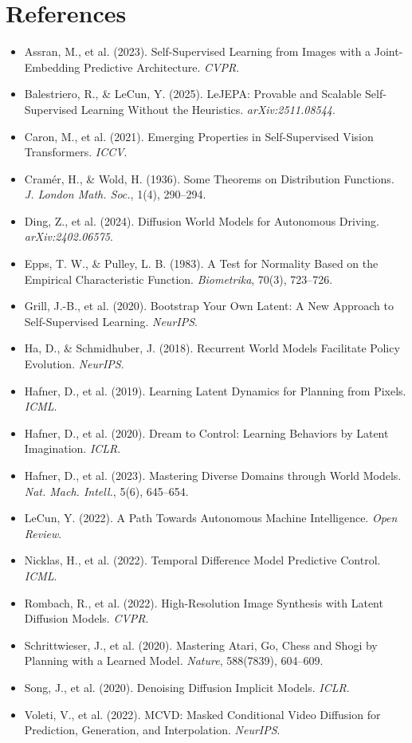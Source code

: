 \documentclass{article}
\begin{document}
\section*{References}
\small
\begin{itemize}
    \item Assran, M., et al. (2023). Self-Supervised Learning from Images with a Joint-Embedding Predictive Architecture. \emph{CVPR}.
    \item Balestriero, R., \& LeCun, Y. (2025). LeJEPA: Provable and Scalable Self-Supervised Learning Without the Heuristics. \emph{arXiv:2511.08544}.
    \item Caron, M., et al. (2021). Emerging Properties in Self-Supervised Vision Transformers. \emph{ICCV}.
    \item Cramér, H., \& Wold, H. (1936). Some Theorems on Distribution Functions. \emph{J. London Math. Soc.}, 1(4), 290--294.
    \item Ding, Z., et al. (2024). Diffusion World Models for Autonomous Driving. \emph{arXiv:2402.06575}.
    \item Epps, T. W., \& Pulley, L. B. (1983). A Test for Normality Based on the Empirical Characteristic Function. \emph{Biometrika}, 70(3), 723--726.
    \item Grill, J.-B., et al. (2020). Bootstrap Your Own Latent: A New Approach to Self-Supervised Learning. \emph{NeurIPS}.
    \item Ha, D., \& Schmidhuber, J. (2018). Recurrent World Models Facilitate Policy Evolution. \emph{NeurIPS}.
    \item Hafner, D., et al. (2019). Learning Latent Dynamics for Planning from Pixels. \emph{ICML}.
    \item Hafner, D., et al. (2020). Dream to Control: Learning Behaviors by Latent Imagination. \emph{ICLR}.
    \item Hafner, D., et al. (2023). Mastering Diverse Domains through World Models. \emph{Nat. Mach. Intell.}, 5(6), 645--654.
    \item LeCun, Y. (2022). A Path Towards Autonomous Machine Intelligence. \emph{Open Review}.
    \item Nicklas, H., et al. (2022). Temporal Difference Model Predictive Control. \emph{ICML}.
    \item Rombach, R., et al. (2022). High-Resolution Image Synthesis with Latent Diffusion Models. \emph{CVPR}.
    \item Schrittwieser, J., et al. (2020). Mastering Atari, Go, Chess and Shogi by Planning with a Learned Model. \emph{Nature}, 588(7839), 604--609.
    \item Song, J., et al. (2020). Denoising Diffusion Implicit Models. \emph{ICLR}.
    \item Voleti, V., et al. (2022). MCVD: Masked Conditional Video Diffusion for Prediction, Generation, and Interpolation. \emph{NeurIPS}.
\end{itemize}
\end{document}
